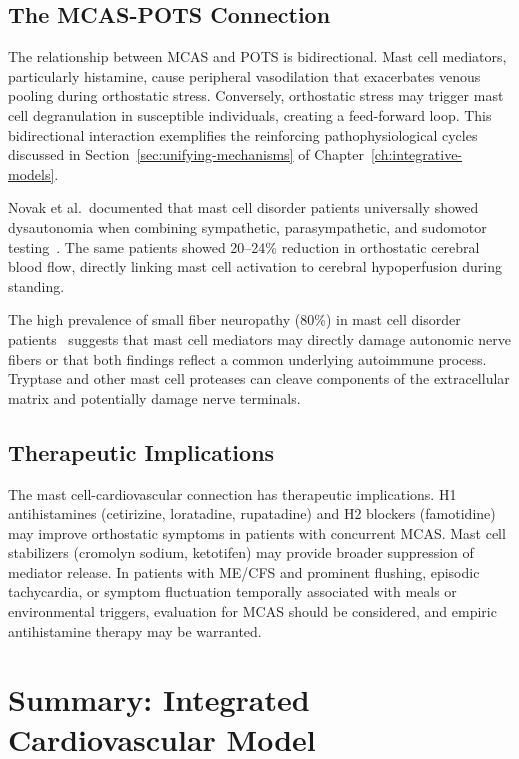 \subsection{The MCAS-POTS Connection}

The relationship between MCAS and POTS is bidirectional. Mast cell mediators, particularly histamine, cause peripheral vasodilation that exacerbates venous pooling during orthostatic stress. Conversely, orthostatic stress may trigger mast cell degranulation in susceptible individuals, creating a feed-forward loop. This bidirectional interaction exemplifies the reinforcing pathophysiological cycles discussed in Section~\ref{sec:unifying-mechanisms} of Chapter~\ref{ch:integrative-models}.

Novak et al.\ documented that mast cell disorder patients universally showed dysautonomia when combining sympathetic, parasympathetic, and sudomotor testing~\cite{Novak2022}. The same patients showed 20--24\% reduction in orthostatic cerebral blood flow, directly linking mast cell activation to cerebral hypoperfusion during standing.

The high prevalence of small fiber neuropathy (80\%) in mast cell disorder patients~\cite{Novak2022} suggests that mast cell mediators may directly damage autonomic nerve fibers or that both findings reflect a common underlying autoimmune process. Tryptase and other mast cell proteases can cleave components of the extracellular matrix and potentially damage nerve terminals.

\subsection{Therapeutic Implications}

The mast cell-cardiovascular connection has therapeutic implications. H1 antihistamines (cetirizine, loratadine, rupatadine) and H2 blockers (famotidine) may improve orthostatic symptoms in patients with concurrent MCAS. Mast cell stabilizers (cromolyn sodium, ketotifen) may provide broader suppression of mediator release. In patients with ME/CFS and prominent flushing, episodic tachycardia, or symptom fluctuation temporally associated with meals or environmental triggers, evaluation for MCAS should be considered, and empiric antihistamine therapy may be warranted.

\section{Summary: Integrated Cardiovascular Model}
\label{sec:cv-summary}

